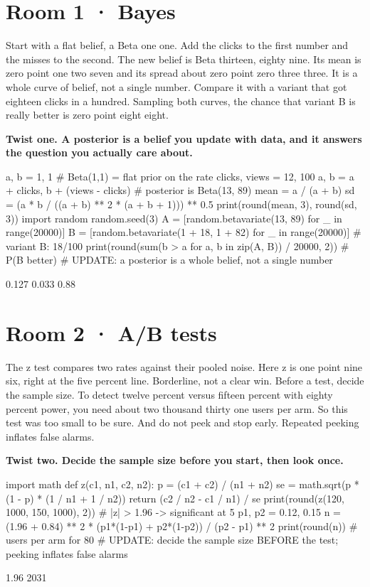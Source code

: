 \documentclass[11pt,a4paper]{report}
\begin{document}
\section*{Room 1 · Bayes}
Start with a flat belief, a Beta one one. Add the clicks to the first number and the misses to the second. The new belief is Beta thirteen, eighty nine. Its mean is zero point one two seven and its spread about zero point zero three three. It is a whole curve of belief, not a single number. Compare it with a variant that got eighteen clicks in a hundred. Sampling both curves, the chance that variant B is really better is zero point eight eight.
\begin{tcolorbox}[colback=yellow!12,colframe=orange!70!black,boxrule=0.4pt,left=4pt,right=4pt,top=2pt,bottom=2pt]\textbf{Twist one. A posterior is a belief you update with data, and it answers the question you actually care about.}\end{tcolorbox}
\begin{Code}
a, b = 1, 1                                 # Beta(1,1) = flat prior on the rate
clicks, views = 12, 100
a, b = a + clicks, b + (views - clicks)     # posterior is Beta(13, 89)
mean = a / (a + b)
sd = (a * b / ((a + b) ** 2 * (a + b + 1))) ** 0.5
print(round(mean, 3), round(sd, 3))
import random
random.seed(3)
A = [random.betavariate(13, 89) for _ in range(20000)]
B = [random.betavariate(1 + 18, 1 + 82) for _ in range(20000)]   # variant B: 18/100
print(round(sum(b > a for a, b in zip(A, B)) / 20000, 2))        # P(B better)
# UPDATE: a posterior is a whole belief, not a single number
\end{Code}
\begin{Out}
0.127 0.033
0.88
\end{Out}
\section*{Room 2 · A/B tests}
The z test compares two rates against their pooled noise. Here z is one point nine six, right at the five percent line. Borderline, not a clear win. Before a test, decide the sample size. To detect twelve percent versus fifteen percent with eighty percent power, you need about two thousand thirty one users per arm. So this test was too small to be sure. And do not peek and stop early. Repeated peeking inflates false alarms.
\begin{tcolorbox}[colback=yellow!12,colframe=orange!70!black,boxrule=0.4pt,left=4pt,right=4pt,top=2pt,bottom=2pt]\textbf{Twist two. Decide the sample size before you start, then look once.}\end{tcolorbox}
\begin{Code}
import math
def z(c1, n1, c2, n2):
    p = (c1 + c2) / (n1 + n2)
    se = math.sqrt(p * (1 - p) * (1 / n1 + 1 / n2))
    return (c2 / n2 - c1 / n1) / se
print(round(z(120, 1000, 150, 1000), 2))    # |z| > 1.96 -> significant at 5%
p1, p2 = 0.12, 0.15
n = (1.96 + 0.84) ** 2 * (p1*(1-p1) + p2*(1-p2)) / (p2 - p1) ** 2
print(round(n))                             # users per arm for 80%
# UPDATE: decide the sample size BEFORE the test; peeking inflates false alarms
\end{Code}
\begin{Out}
1.96
2031
\end{Out}
\end{document}
